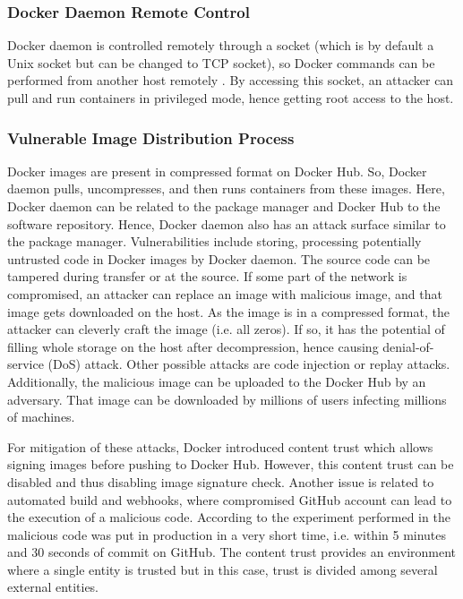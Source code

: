 \subsubsection{Docker Daemon Remote Control}

Docker daemon is controlled remotely through a socket (which
is by default a Unix socket but can be changed to TCP socket),
so Docker commands can be performed from another host
remotely \cite{combe2016docker}. By accessing this socket,
an attacker can pull and run containers in privileged mode,
hence getting root access to the host.

\subsubsection{Vulnerable Image Distribution Process}

Docker images are present in compressed format on Docker Hub.
So, Docker daemon pulls, uncompresses, and then runs containers
from these images. Here, Docker daemon can be related to the
package manager and Docker Hub to the software repository.
Hence, Docker daemon also has an attack surface similar
to the package manager. Vulnerabilities include storing,
processing potentially untrusted code in Docker images by
Docker daemon. The source code can be tampered during transfer
or at the source. If some part of the network is compromised,
an attacker can replace an image with malicious image, and
that image gets downloaded on the host. As the image is in
a compressed format, the attacker can cleverly craft the
image (i.e. all zeros). If so, it has the potential of
filling whole storage on the host after decompression,
hence causing
denial-of-service (DoS) attack. Other possible attacks are
code injection or replay attacks. Additionally, the malicious
image can be uploaded to the Docker Hub by an adversary.
That image can be downloaded by millions of users infecting
millions of machines.

For mitigation of these attacks, Docker introduced content
trust which allows signing images before pushing to Docker
Hub. However, this content trust can be disabled and thus disabling
image signature check. Another issue is related to automated build and
webhooks, where compromised GitHub
account can lead to the execution of a malicious code. According
to the experiment performed in \cite{martin2018docker} the
malicious code was put in production in a very short time, i.e. within 5 minutes and
30 seconds of commit on GitHub. The content trust provides
an environment where a single entity is trusted but in this
case, trust is divided among several external entities.

